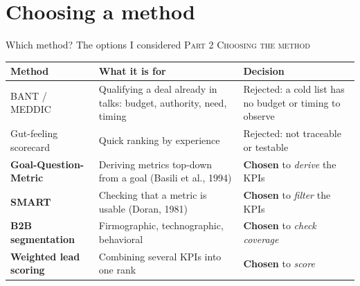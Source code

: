 \documentclass[aspectratio=169,11pt]{beamer}
\newcommand{\partlabel}[1]{{\small\color{assume}\textsc{#1}}\par\vspace{0.3em}}
\begin{document}
\section{Choosing a method}

\begin{frame}{Which method? The options I considered}
  \partlabel{Part 2 \textbullet{} Choosing the method}
  \small
  \begin{tabular}{@{}p{3.4cm} p{5.6cm} p{3.6cm}@{}}
    \toprule
    \textbf{Method} & \textbf{What it is for} & \textbf{Decision} \\
    \midrule
    BANT / MEDDIC & Qualifying a deal already in talks: budget, authority, need, timing &
      \textcolor{bad}{Rejected:} a cold list has no budget or timing to observe \\
    Gut-feeling scorecard & Quick ranking by experience & \textcolor{bad}{Rejected:} not
      traceable or testable \\
    \textbf{Goal-Question-Metric} & Deriving metrics top-down from a goal
      (Basili et al., 1994) & \textcolor{accent}{\textbf{Chosen}} to \emph{derive} the KPIs \\
    \textbf{SMART} & Checking that a metric is usable (Doran, 1981) &
      \textcolor{accent}{\textbf{Chosen}} to \emph{filter} the KPIs \\
    \textbf{B2B segmentation} & Firmographic, technographic, behavioral &
      \textcolor{accent}{\textbf{Chosen}} to \emph{check coverage} \\
    \textbf{Weighted lead scoring} & Combining several KPIs into one rank &
      \textcolor{accent}{\textbf{Chosen}} to \emph{score} \\
    \bottomrule
  \end{tabular}
\end{frame}
\end{document}
